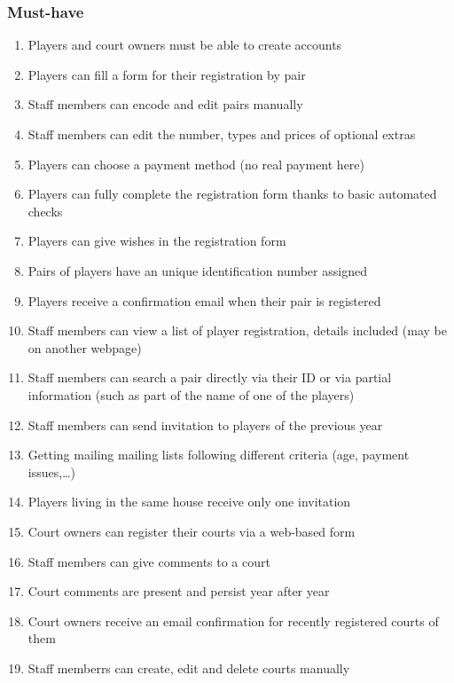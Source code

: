 \subsubsection{Must-have}

\begin{enumerate}
    \item Players and court owners must be able to create accounts
    \item Players can fill a form for their registration by pair
    \item Staff members can encode and edit pairs manually
    \item Staff members can edit the number, types and prices of
        optional extras
    \item Players can choose a payment method (no real payment here)
    \item Players can fully complete the registration form thanks to
        basic automated checks
    \item Players can give wishes in the registration form
    \item Pairs of players have an unique identification number assigned
    \item Players receive a confirmation email when their pair is
        registered
    \item Staff members can view a list of player registration, details
        included (may be on another webpage)
    \item Staff members can search a pair directly via their ID or via
        partial information (such as part of the name of one of the
        players)
    \item Staff members can send invitation to players of the previous
        year
    \item Getting mailing mailing lists following different criteria
        (age, payment issues,\ldots)
    \item Players living in the same house receive only one invitation
    \item Court owners can register their courts via a web-based form
    \item Staff members can give comments to a court
    \item Court comments are present and persist year after year
    \item Court owners receive an email confirmation for recently
        registered courts of them
    \item Staff memberrs can create, edit and delete courts manually

\end{enumerate}
